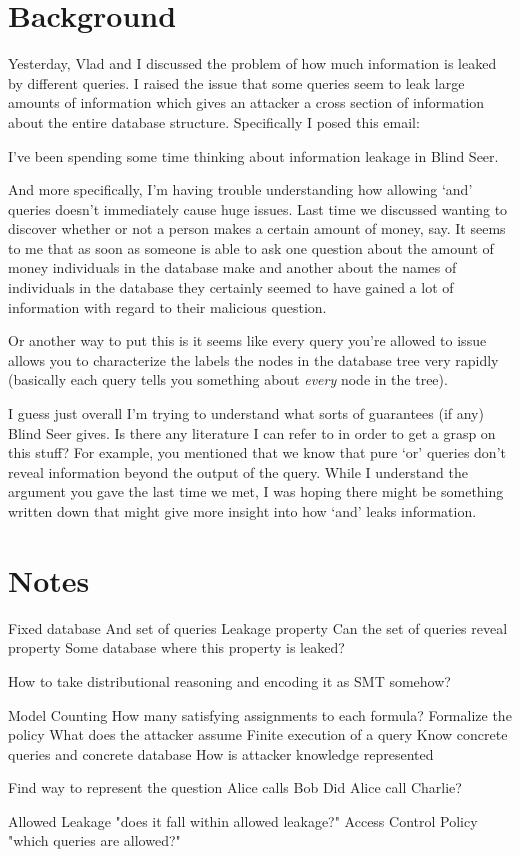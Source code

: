 \documentclass{article}
\begin{document}
\section{Background}
Yesterday, Vlad and I discussed the problem of how much information is leaked
by different queries.
%
I raised the issue that some queries seem to leak large amounts of information
which gives an attacker a cross section of information about the entire
database structure.
%
Specifically I posed this email:

\begin{displayquote}
I've been spending some time thinking about information leakage in Blind Seer.

And more specifically, I'm having trouble understanding how allowing `and'
queries doesn’t immediately cause huge issues. Last time we discussed wanting
to discover whether or not a person makes a certain amount of money, say. It
seems to me that as soon as someone is able to ask one question about the
amount of money individuals in the database make and another about the names of
individuals in the database they certainly seemed to have gained a lot of
information with regard to their malicious question.

Or another way to put this is it seems like every query you're allowed to issue
allows you to characterize the labels the nodes in the database tree very
rapidly (basically each query tells you something about \emph{every} node in the
tree).

I guess just overall I'm trying to understand what sorts of guarantees (if any)
Blind Seer gives. Is there any literature I can refer to in order to get a
grasp on this stuff? For example, you mentioned that we know that pure `or'
queries don’t reveal information beyond the output of the query. While I
understand the argument you gave the last time we met, I was hoping there might
be something written down that might give more insight into how `and' leaks
information.
\end{displayquote}
%


\section{Notes}

Fixed database
And set of queries
Leakage property
Can the set of queries reveal property
Some database where this property is leaked?

How to take distributional reasoning and encoding it as SMT somehow?

Model Counting
How many satisfying assignments to each formula?
Formalize the policy
  What does the attacker assume
  Finite execution of a query
  Know concrete queries and concrete database
  How is attacker knowledge represented

Find way to represent the question
  Alice calls Bob
  Did Alice call Charlie?

Allowed Leakage "does it fall within allowed leakage?"
Access Control Policy "which queries are allowed?"
\end{document}
